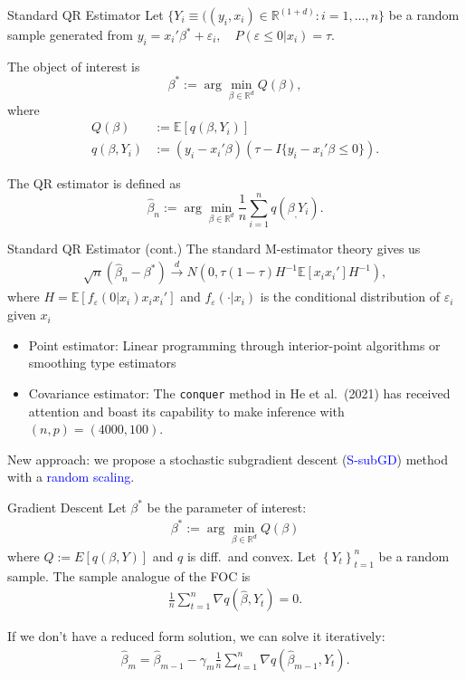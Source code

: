 \documentclass[beamer, t]{beamer}
\newcommand{\eqs}[1]{\begin{align*}#1\end{align*}}
\newcommand{\bit}{\begin{itemize}}
\newcommand{\eit}{\end{itemize}}
\newcommand{\tcb}{\textcolor{blue}}
\begin{document}
\begin{frame}{Standard QR Estimator}
	Let $\{Y_i\equiv((y_i,x_i) \in \mathbb{R}^(1+d): i=1,\ldots,n\}$ be a random sample generated from 
		$y_i = x_i'\beta^*+ \varepsilon_i,\quad P(\varepsilon\leq 0|x_i)= \tau.$
	\bigskip 

	The object of interest is
	$$
		\beta^* := \arg\min_{\beta \in \mathbb{R}^d} Q(\beta),
	$$
	where 
	\begin{align*}
	Q(\beta) & := \mathbb{E}[q(\beta,Y_i)]\\
	q(\beta, Y_i) &:=(y_i-x_i'\beta)(\tau-I\{y_i -x_i'\beta \le0\}).
	\end{align*}
	\bigskip

	The QR estimator is defined as
	$$
		\widehat{\beta}_n := \arg\min_{\beta \in \mathbb{R}^d} \frac{1}{n} \sum_{i=1}^{n} q(\beta_,Y_i).
	$$
\end{frame}

\begin{frame}{Standard QR Estimator (cont.)}
	The standard M-estimator theory gives us 
	\eqs{
	\sqrt{n}(\widehat\beta_n-\beta^*) \overset{d}{\to} N(0, \tau(1-\tau)H^{-1}\mathbb E[x_ix_i'] H^{-1}),
	}
	where $H= \mathbb E [f_{\varepsilon}(0|x_i)x_ix_i']$ and $f_{\varepsilon}(\cdot|x_i)$ is the conditional distribution of $\varepsilon_i$ given $x_i$

	\bit
		\item Point estimator: Linear programming through interior-point algorithms or smoothing type estimators
		\item Covariance estimator: 
		The \texttt{conquer} method in He et al.~(2021) has received attention and boast its capability to make inference with $ (n,p)=(4000,100) $.
	\eit
	New approach: we propose a stochastic subgradient descent (\tcb{S-subGD}) method with a \tcb{random scaling}.
\end{frame}




\begin{frame}{Gradient Descent}
Let $\beta^*$ be the parameter of interest:
\eqs{
    \beta^{*}:=\arg\min_{\beta\in\mathbb{R}^{d}}Q\left(\beta\right)
}
where $Q:=E[q(\beta,Y)]$ and $q$ is diff.~and convex. Let $\left\{ Y_{t}\right\} _{t=1}^{n}$ be a random sample. The sample analogue of the FOC is
\eqs{
    \frac{1}{n}\sum_{t=1}^n \nabla q\left(\hat{\beta},Y_{t}\right) = 0.
}

If we don't have a reduced form solution, we can solve it iteratively:
\eqs{
    \hat{\beta}_{m} = \hat{\beta}_{m-1} - \gamma_m \frac{1}{n}\sum_{t=1}^n \nabla q\left(\hat{\beta}_{m-1},Y_{t}\right).
}
\end{frame}
\end{document}
